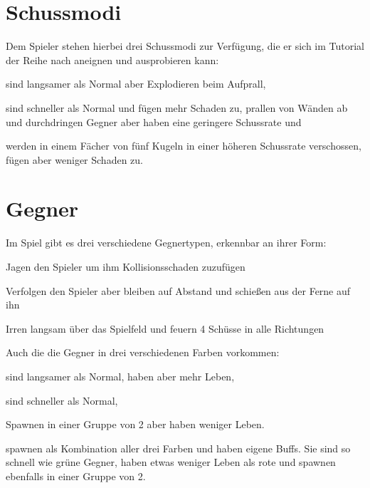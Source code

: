 \documentclass[a4paper,10pt,ngerman,fontsize=12pt]{scrreprt}
\begin{document}
\section{Schussmodi}

Dem Spieler stehen hierbei drei Schussmodi zur Verfügung, die er sich im Tutorial der Reihe nach aneignen und ausprobieren kann:

\renewcommand{\itmspace}{4.5em}
{sind langsamer als Normal aber Explodieren beim Aufprall,}

{sind schneller als Normal und fügen mehr Schaden zu, prallen von Wänden ab und durchdringen Gegner aber haben eine geringere Schussrate und}

{werden in einem Fächer von fünf Kugeln in einer höheren Schussrate verschossen, fügen aber weniger Schaden zu.}




\section{Gegner}

Im Spiel gibt es drei verschiedene Gegnertypen, erkennbar an ihrer Form:

\renewcommand{\itmspace}{4.5em}
{Jagen den Spieler um ihm Kollisionsschaden zuzufügen}

{Verfolgen den Spieler aber bleiben auf Abstand und schie{\ss}en aus der Ferne auf ihn}

{Irren langsam über das Spielfeld und feuern 4 Schüsse in alle Richtungen}

Auch die die Gegner in drei verschiedenen Farben vorkommen:

\renewcommand{\itmspace}{7.5em}
{sind langsamer als Normal, haben aber mehr Leben,}

{sind schneller als Normal,}

{Spawnen in einer Gruppe von 2 aber haben weniger Leben.}

{spawnen als Kombination aller drei Farben und haben eigene Buffs. Sie sind so schnell wie grüne Gegner, haben etwas weniger Leben als rote und spawnen ebenfalls in einer Gruppe von 2.}
\end{document}
